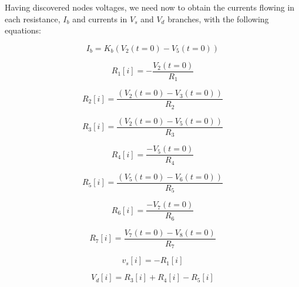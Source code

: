 \noindent Having discovered nodes voltages, we need now to obtain the currents flowing in each resistance, 
$I_b$ and currents in $V_s$ and $V_d$ branches, with the following equations:

\begin{equation}
I_b = K_b(V_2(t=0) - V_5(t=0))
  \label{eq:Ib}
\end{equation}

\begin{equation}
R_1[i] = -\frac{V_2(t=0)}{R_1}
  \label{eq: iR10}
\end{equation}

\begin{equation}
R_2[i] = \frac{(V_2(t=0) - V_3(t=0))}{R_2}
  \label{eq: iR20}
\end{equation}

\begin{equation}
R_3[i] = \frac{(V_2(t=0) - V_5(t=0))}{R_3}
  \label{eq: iR30}
\end{equation}

\begin{equation}
R_4[i] = \frac{-V_5(t=0)}{R_4}
  \label{eq: iR40}
\end{equation}

\begin{equation}
R_5[i] = \frac{(V_5(t=0) - V_6(t=0))}{R_5}
  \label{eq: iR50}
\end{equation}

\begin{equation}
R_6[i] = \frac{-V_7(t=0)}{R_6}
  \label{eq: iR60}
\end{equation}

\begin{equation}
R_7[i] = \frac{V_7(t=0) - V_8(t=0)}{R_7}
  \label{eq: iR70}
\end{equation}

\begin{equation}
v_s[i] = -R_1[i]
  \label{eq: ivs0}
\end{equation}

\begin{equation}
V_d[i] = R_3[i] + R_4[i] - R_5[i]
  \label{eq: ivd0}
\end{equation}

